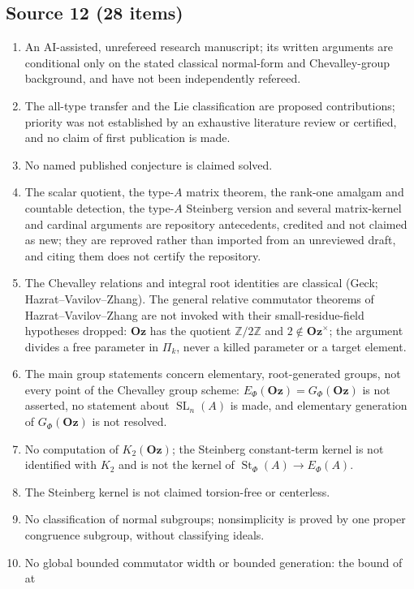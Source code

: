 \documentclass[11pt,oneside]{article}
\numberwithin{equation}{section}
\theoremstyle{definition}
\theoremstyle{remark}
\newcommand{\Oz}{\mathbf{Oz}}
\newcommand{\Z}{\mathbb Z}
\newcommand{\SL}{\operatorname{SL}}
\newcommand{\St}{\operatorname{St}}
\begin{document}
\subsection{Source 12 (28 items)}
\begin{enumerate}[leftmargin=*,widest=00,label=12.\arabic*]
\item An AI-assisted, unrefereed research manuscript; its written arguments are
conditional only on the stated classical normal-form and Chevalley-group
background, and have not been independently refereed.
\item The all-type transfer and the Lie classification are proposed
contributions; priority was not established by an exhaustive literature review
or certified, and no claim of first publication is made.
\item No named published conjecture is claimed solved.
\item The scalar quotient, the type-$A$ matrix theorem, the rank-one amalgam and
countable detection, the type-$A$ Steinberg version and several matrix-kernel
and cardinal arguments are repository antecedents, credited and not claimed as
new; they are reproved rather than imported from an unreviewed draft, and citing
them does not certify the repository.
\item The Chevalley relations and integral root identities are classical
(Geck; Hazrat--Vavilov--Zhang). The general relative commutator theorems of
Hazrat--Vavilov--Zhang are not invoked with their small-residue-field
hypotheses dropped: $\Oz$ has the quotient $\Z/2\Z$ and $2\notin\Oz^\times$; the
argument divides a free parameter in $\Pi_k$, never a killed parameter or a
target element.
\item The main group statements concern elementary, root-generated groups, not
every point of the Chevalley group scheme: $E_\Phi(\Oz)=G_\Phi(\Oz)$ is not
asserted, no statement about $\SL_n(A)$ is made, and elementary generation of
$G_\Phi(\Oz)$ is not resolved.
\item No computation of $K_2(\Oz)$; the Steinberg constant-term kernel is not
identified with $K_2$ and is not the kernel of $\St_\Phi(A)\to E_\Phi(A)$.
\item The Steinberg kernel is not claimed torsion-free or centerless.
\item No classification of normal subgroups; nonsimplicity is proved by one
proper congruence subgroup, without classifying ideals.
\item No global bounded commutator width or bounded generation: the bound of at

\end{enumerate}
\end{document}
